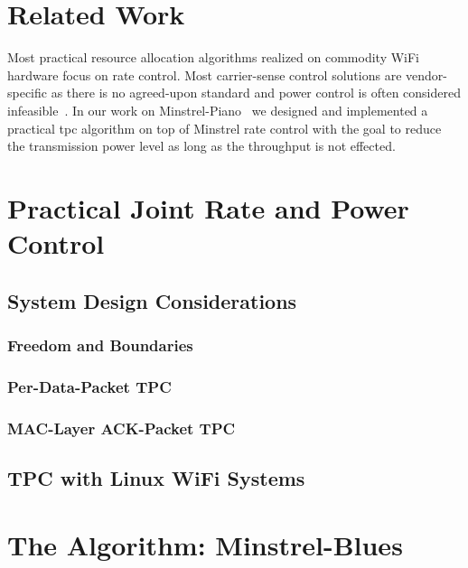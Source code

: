 \documentclass{sig-alternate}
\begin{document}
	\section{Related Work}
	\label{s:related}
	Most practical resource allocation algorithms realized on commodity
	WiFi hardware focus on rate control. Most carrier-sense control solutions
	are vendor-specific as there is no agreed-upon standard and power
	control is often considered infeasible~\cite{abdesslem_feasibility_2006,
	shrivastava_feasibility_2007,shrivastava_understanding_2007}.
	In our work on Minstrel-Piano~\cite{Huehn_ICCCN_2012} we designed and
	implemented a practical tpc algorithm on top of Minstrel rate control
	with the goal to reduce the transmission power level as long as the
	throughput is not effected.

	\section{Practical Joint Rate and Power Control}
	\label{s:practical-design} 

		\subsection{System Design Considerations}
		\label{s:system-design}

			\subsubsection{Freedom and Boundaries}
			\label{s:freedom-boundaries}

			\subsubsection{Per-Data-Packet TPC}
			\label{s:tpc-data}

			\subsubsection{MAC-Layer ACK-Packet TPC}
			\label{s:tpc-ack}

		\subsection{TPC with Linux WiFi Systems}
		\label{s:todays-wifi-systems}


	\section{The Algorithm: Minstrel-Blues}
	\label{s:minstrel-blues}
\end{document}
